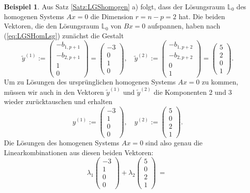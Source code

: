 \documentclass[a4paper,11pt,oneside]{article}
\theoremstyle{definition}
\newtheorem{example}{Beispiel}
\begin{document}
\begin{example}
Aus Satz \ref{Satz:LGShomogen} a) folgt, dass der Lösungsraum ${\mathbb L}_0$ des homogenen Systems $Ax=0$ die Dimension $r=n-p=2$ hat. Die beiden Vektoren, die den Lösungsraum ${\mathbb L}_0$ von $ Bx=0$ aufspannen, haben nach (\ref{eq:LGSHomLsg}) zunächst die Gestalt
$$
{\tilde y}^{(1)}
:=
\begin{pmatrix}-b_{1,p+1}\\-b_{2,p+1}\\1\\0\end{pmatrix}
=
\begin{pmatrix}-3\\ 0\\ 1\\ 0\end{pmatrix},
\quad
{\tilde y}^{(2)}
:=
\begin{pmatrix}-b_{1,p+2}\\-b_{2,p+2}\\0\\1\end{pmatrix}
=
\begin{pmatrix}5\\2\\0\\1\end{pmatrix}.
$$
Um zu Lösungen des ursprünglichen homogenen Systems $Ax=0$ zu kommen, müssen wir auch in den Vektoren $\tilde{y}^{(1)}$ und $\tilde{y}^{(2)}$ die Komponenten 2 und 3 wieder zurücktauschen und erhalten
$$
y^{(1)}:=\begin{pmatrix}-3\\1\\0\\0\end{pmatrix},\quad
y^{(2)}:=\begin{pmatrix}5\\0\\2\\1\end{pmatrix}.
$$
Die Lösungen des homogenen Systems $Ax=0$ sind also genau die Linearkombinationen aus diesen beiden Vektoren:
\[
\lambda_1\begin{pmatrix}-3\\1\\0\\0\end{pmatrix}+
\lambda_2\begin{pmatrix}5\\0\\2\\1\end{pmatrix} \ =\
\]
\end{example}
\end{document}
